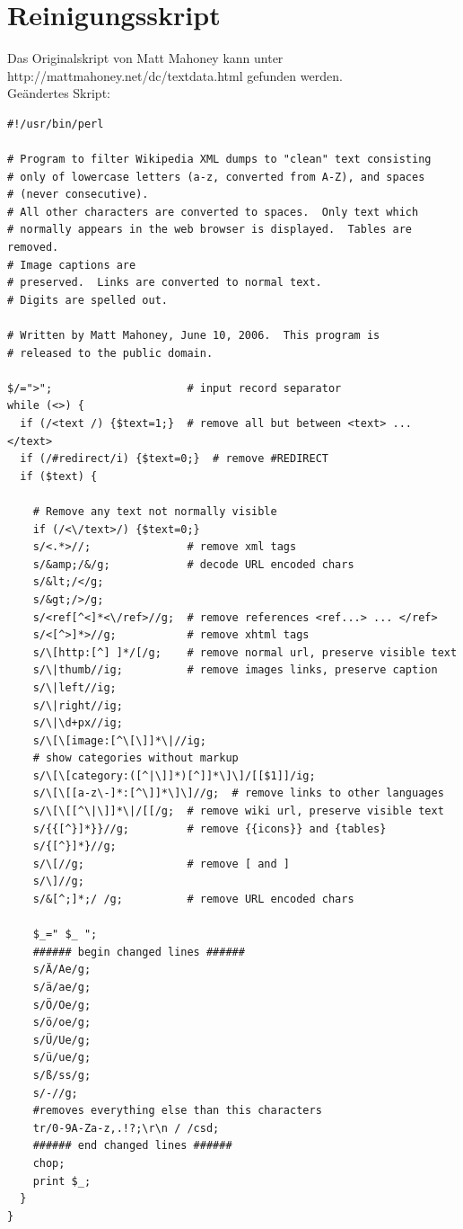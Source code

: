 \documentclass[12pt,a4paper]{report}
\begin{document}
\newpage
\section{Reinigungsskript}
	\label{sec:Perlskript}
Das Originalskript von Matt Mahoney kann unter \\http://mattmahoney.net/dc/textdata.html gefunden werden.\\
Geändertes Skript:\\
\begin{verbatim}
#!/usr/bin/perl

# Program to filter Wikipedia XML dumps to "clean" text consisting  
# only of lowercase letters (a-z, converted from A-Z), and spaces 
# (never consecutive).
# All other characters are converted to spaces.  Only text which 
# normally appears in the web browser is displayed.  Tables are removed.  
# Image captions are
# preserved.  Links are converted to normal text.  
# Digits are spelled out.

# Written by Matt Mahoney, June 10, 2006.  This program is 
# released to the public domain.

$/=">";                     # input record separator
while (<>) {
  if (/<text /) {$text=1;}  # remove all but between <text> ... </text>
  if (/#redirect/i) {$text=0;}  # remove #REDIRECT
  if ($text) {

    # Remove any text not normally visible
    if (/<\/text>/) {$text=0;}
    s/<.*>//;               # remove xml tags
    s/&amp;/&/g;            # decode URL encoded chars
    s/&lt;/</g;
    s/&gt;/>/g;
    s/<ref[^<]*<\/ref>//g;  # remove references <ref...> ... </ref>
    s/<[^>]*>//g;           # remove xhtml tags
    s/\[http:[^] ]*/[/g;    # remove normal url, preserve visible text
    s/\|thumb//ig;          # remove images links, preserve caption
    s/\|left//ig;
    s/\|right//ig;
    s/\|\d+px//ig;
    s/\[\[image:[^\[\]]*\|//ig;
    # show categories without markup
    s/\[\[category:([^|\]]*)[^]]*\]\]/[[$1]]/ig;  
    s/\[\[[a-z\-]*:[^\]]*\]\]//g;  # remove links to other languages
    s/\[\[[^\|\]]*\|/[[/g;  # remove wiki url, preserve visible text
    s/{{[^}]*}}//g;         # remove {{icons}} and {tables}
    s/{[^}]*}//g;
    s/\[//g;                # remove [ and ]
    s/\]//g;
    s/&[^;]*;/ /g;          # remove URL encoded chars

    $_=" $_ ";
    ###### begin changed lines ######
    s/Ä/Ae/g;
    s/ä/ae/g;
    s/Ö/Oe/g;
    s/ö/oe/g;
    s/Ü/Ue/g;
    s/ü/ue/g;
    s/ß/ss/g;
    s/-//g;
    #removes everything else than this characters
    tr/0-9A-Za-z,.!?;\r\n / /csd; 
    ###### end changed lines ######
    chop;
    print $_;
  }
}
	\end{verbatim}
\end{document}

